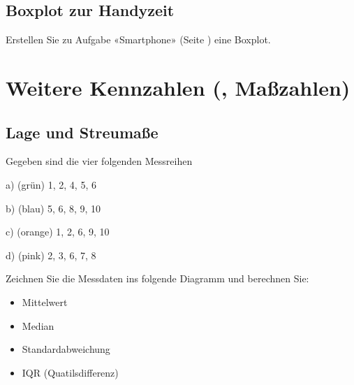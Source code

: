 \newpage


\subsection{Boxplot zur Handyzeit}
Erstellen Sie zu Aufgabe «Smartphone»
(Seite \pageref{handyZeit}) eine Boxplot.





\section{Weitere Kennzahlen (, Maßzahlen)}

\subsection{Lage und Streumaße}
Gegeben sind die vier folgenden Messreihen

a) (grün) 1, 2, 4, 5, 6

b) (blau) 5, 6, 8, 9, 10

c) (orange) 1, 2, 6, 9, 10

d) (pink) 2, 3, 6, 7, 8

Zeichnen Sie die Messdaten ins folgende Diagramm und berechnen Sie:
\begin{itemize}
\item Mittelwert
\item Median
\item Standardabweichung
\item IQR (Quatilsdifferenz)
\end{itemize}


